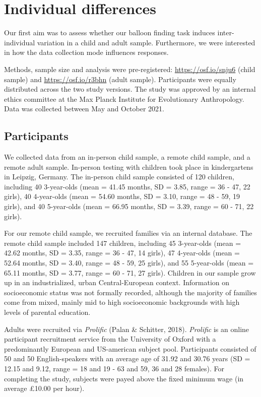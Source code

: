 \documentclass[
  man,floatsintext]{apa6}
\begin{document}
\hypertarget{individual-differences}{%
\section{Individual differences}\label{individual-differences}}

Our first aim was to assess whether our balloon finding task induces inter-individual variation in a child and adult sample. Furthermore, we were interested in how the data collection mode influences responses.

Methods, sample size and analysis were pre-registered: \url{https://osf.io/snju6} (child sample) and \url{https://osf.io/r3bhn} (adult sample). Participants were equally distributed across the two study versions. The study was approved by an internal ethics committee at the Max Planck Institute for Evolutionary Anthropology. Data was collected between May and October 2021.

\hypertarget{participants}{%
\subsection{Participants}\label{participants}}

We collected data from an in-person child sample, a remote child sample, and a remote adult sample.
In-person testing with children took place in kindergartens in Leipzig, Germany. The in-person child sample consisted of
120 children, including
40 3-year-olds
(mean = 41.45 months,
SD = 3.85,
range = 36
- 47,
22 girls),
40 4-year-olds
(mean = 54.60 months,
SD = 3.10,
range = 48
- 59,
19 girls),
and 40 5-year-olds
(mean = 66.95 months,
SD = 3.39,
range = 60
- 71,
22 girls).

For our remote child sample, we recruited families via an internal database. The remote child sample included 147 children, including
45 3-year-olds
(mean = 42.62 months,
SD = 3.35,
range = 36
- 47,
14 girls),
47 4-year-olds
(mean = 52.64 months,
SD = 3.40,
range = 48
- 59,
25 girls),
and 55 5-year-olds
(mean = 65.11 months,
SD = 3.77,
range = 60
- 71,
27 girls). Children in our sample grow up in an industrialized, urban Central-European context. Information on socioeconomic status was not formally recorded, although the majority of families come from mixed, mainly mid to high socioeconomic backgrounds with high levels of parental education.

Adults were recruited via \emph{Prolific} (Palan \& Schitter, 2018). \emph{Prolific} is an online participant recruitment service from the University of Oxford with a predominantly European and US-american subject pool. Participants consisted of 50 and 50 English-speakers with an average age of 31.92 and 30.76 years (SD = 12.15 and 9.12, range = 18 and 19 - 63 and 59, 36 and 28 females).
For completing the study, subjects were payed above the fixed minimum wage (in average £10.00 per hour).
\end{document}
